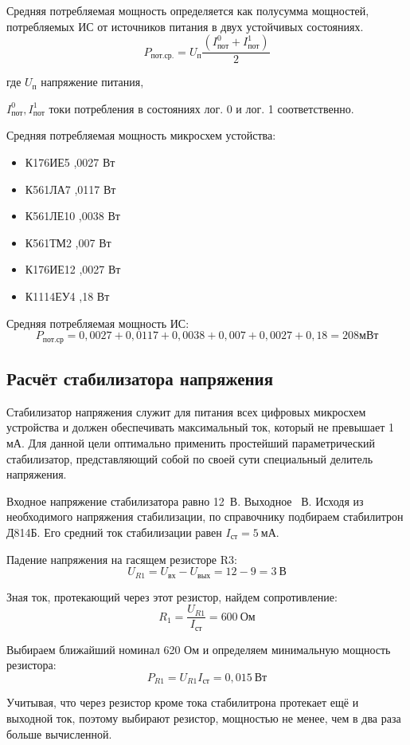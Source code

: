 Средняя потребляемая мощность \longndash определяется как полусумма  мощностей, потребляемых ИС от источников питания в двух устойчивых состояниях.
\[P_\text{пот.ср.}=U_\text{п}\frac{(I^0_\text{пот}+I^1_\text{пот})}{2}\]

где $U_\text{п}$ напряжение питания,

$I^0_\text{пот}, I^1_\text{пот}$ \longndash токи потребления в состояниях лог. 0 и лог. 1 соответственно.

Средняя потребляемая мощность микросхем устойства:
\begin{itemize}
	\item К176ИЕ5 ,0027 Вт
	\item К561ЛА7 ,0117 Вт
	\item К561ЛЕ10 ,0038 Вт
	\item К561ТМ2 ,007 Вт
	\item К176ИЕ12 ,0027 Вт
	\item К1114ЕУ4 ,18 Вт
\end{itemize}

Средняя потребляемая мощность ИС:
\[P_\text{пот.ср}=0,0027+0,0117+0,0038+0,007+0,0027+0,18=208 \text{мВт}\]

\subsection*{Расчёт стабилизатора напряжения}

Стабилизатор напряжения служит для питания всех цифровых микросхем устройства и должен обеспечивать максимальный ток, который не превышает 1 мА. Для данной цели оптимально применить простейший параметрический стабилизатор, представляющий собой по своей сути специальный делитель напряжения.

Входное напряжение стабилизатора равно 12~В. Выходное ~В. Исходя из необходимого напряжения стабилизации, по справочнику \cite{Grigoryev} подбираем стабилитрон Д814Б. Его средний ток стабилизации равен $I_\text{ст} = 5~ \text{мА}$. 

Падение напряжения на гасящем резисторе R3:
\[U_{R1}=U_\text{вх}-U_\text{вых}=12-9=3~ \text{В}\]

Зная ток, протекающий через этот резистор, найдем сопротивление:
\[R_1=\frac{U_{R1}}{I_\text{ст}}=600~ \text{Ом}\]

Выбираем ближайший номинал 620 Ом и определяем минимальную мощность резистора:
\[P_{R1}=U_{R1}I_\text{ст}=0,015~ \text{Вт}\]

Учитывая, что через резистор кроме тока стабилитрона протекает ещё и выходной ток, поэтому выбирают резистор, мощностью не менее, чем в два раза больше вычисленной.